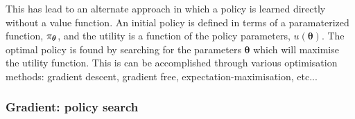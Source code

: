 This has lead to an alternate approach in which a policy is learned directly without a value function. An 
initial policy is defined in terms of a paramaterized function, $\operatorname{\pi_{\boldsymbol{\theta}}}$, and the utility is a function of the 
policy parameters, $u(\boldsymbol{\theta})$. The optimal policy is found by searching for the parameters $\boldsymbol{\theta}$ which 
will maximise the utility function. This is can be accomplished through various optimisation methods: gradient descent, gradient free, 
expectation-maximisation, etc...

\subsubsection{Gradient: policy search}

